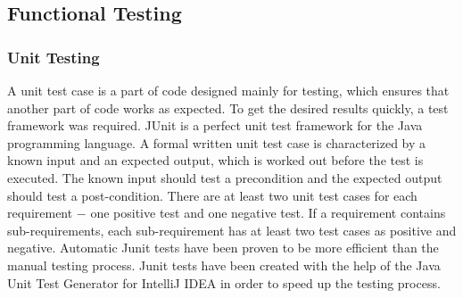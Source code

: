 \subsection{Functional Testing}

\subsubsection{Unit Testing}
A unit test case is a part of code designed mainly for testing, which ensures that another part of code works as expected.
To get the desired results quickly, a test framework was required. JUnit is a perfect unit test framework for the Java programming language.
A formal written unit test case is characterized by a known input and an expected output, which is worked out before the test is executed.
The known input should test a precondition and the expected output should test a post-condition.
There are at least two unit test cases for each requirement $-$ one positive test and one negative test.
If a requirement contains sub-requirements, each sub-requirement has at least two test cases as positive and negative.
Automatic Junit tests have been proven to be more efficient than the manual testing process.
Junit tests have been created with the help of the Java Unit Test Generator for IntelliJ IDEA in order to speed up the testing process.

